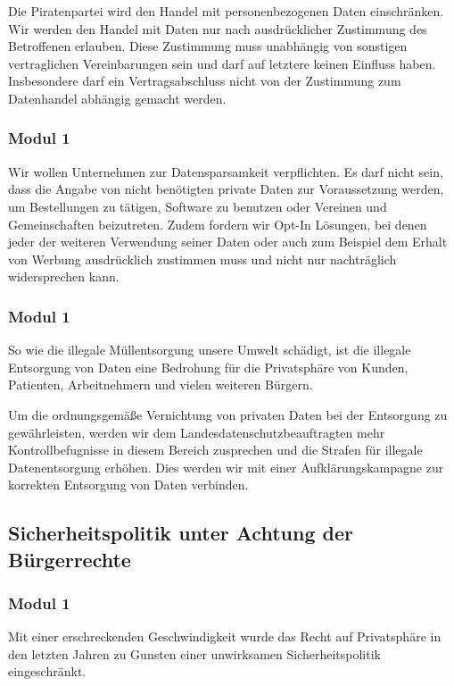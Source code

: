 Die Piratenpartei wird den Handel mit personenbezogenen Daten einschränken. Wir werden den Handel mit Daten nur nach ausdrücklicher Zustimmung des Betroffenen erlauben. Diese Zustimmung muss unabhängig von sonstigen vertraglichen Vereinbarungen sein und darf auf letztere keinen Einfluss haben. Insbesondere darf ein Vertragsabschluss nicht von der Zustimmung zum Datenhandel abhängig gemacht werden.
 
\newpage
{}
\subsubsection{Modul 1}
\abstimmung
Wir wollen Unternehmen zur Datensparsamkeit verpflichten. Es darf nicht sein, dass die Angabe von nicht benötigten private Daten zur Voraussetzung werden, um Bestellungen zu tätigen, Software zu benutzen oder Vereinen und Gemeinschaften beizutreten. Zudem fordern wir Opt-In Lösungen, bei denen jeder der weiteren Verwendung seiner Daten oder auch zum Beispiel dem Erhalt von Werbung ausdrücklich zustimmen muss und nicht nur nachträglich widersprechen kann.
 
\subsubsection{Modul 1}
\abstimmung
So wie die illegale Müllentsorgung unsere Umwelt schädigt, ist die illegale Entsorgung von Daten eine Bedrohung für die Privatsphäre von Kunden, Patienten, Arbeitnehmern und vielen weiteren Bürgern.

Um die ordnungsgemäße Vernichtung von privaten Daten bei der Entsorgung zu gewährleisten, werden wir dem Landesdatenschutzbeauftragten mehr Kontrollbefugnisse in diesem Bereich zusprechen und die Strafen für illegale Datenentsorgung erhöhen. Dies werden wir mit einer Aufklärungskampagne zur korrekten Entsorgung von Daten verbinden.
 
\subsection*{Sicherheitspolitik unter Achtung der Bürgerrechte}
\subsubsection{Modul 1}
\abstimmung
Mit einer erschreckenden Geschwindigkeit wurde das Recht auf Privatsphäre in den letzten Jahren zu Gunsten einer unwirksamen Sicherheitspolitik eingeschränkt.

